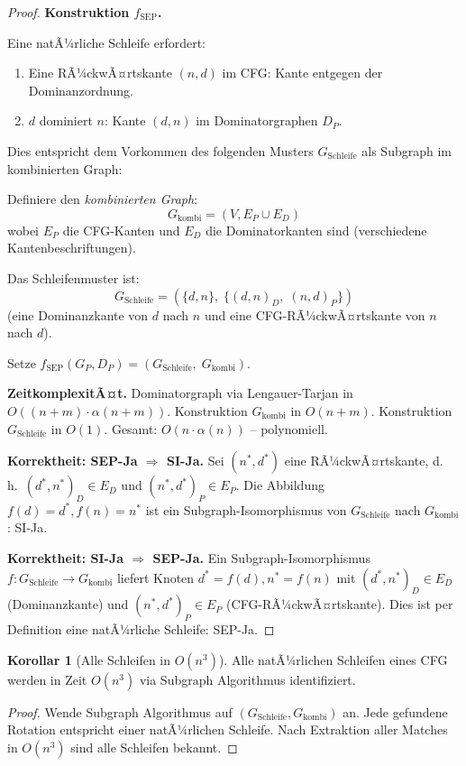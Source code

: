 ﻿\documentclass[a4paper,12pt]{article}
\theoremstyle{definition}
\newtheorem{korollar}{Korollar}
\begin{document}
\begin{proof}
\textbf{Konstruktion $f_{\text{SEP}}$.}

Eine natÃ¼rliche Schleife erfordert:
\begin{enumerate}
    \item Eine RÃ¼ckwÃ¤rtskante $(n, d)$ im CFG: Kante entgegen der Dominanzordnung.
    \item $d$ dominiert $n$: Kante $(d, n)$ im Dominatorgraphen $D_P$.
\end{enumerate}

Dies entspricht dem Vorkommen des folgenden Musters $G_{\text{Schleife}}$ als Subgraph im kombinierten Graph:

Definiere den \emph{kombinierten Graph}:
\[
G_{\text{kombi}} = (V, E_P \cup E_D)
\]
wobei $E_P$ die CFG-Kanten und $E_D$ die Dominatorkanten sind (verschiedene Kantenbeschriftungen).

Das Schleifenmuster ist:
\[
G_{\text{Schleife}} = (\{d, n\},\; \{(d, n)_D,\; (n, d)_P\})
\]
(eine Dominanzkante von $d$ nach $n$ und eine CFG-RÃ¼ckwÃ¤rtskante von $n$ nach $d$).

Setze $f_{\text{SEP}}(G_P, D_P) = (G_{\text{Schleife}},\; G_{\text{kombi}})$.

\textbf{ZeitkomplexitÃ¤t.}
Dominatorgraph via Lengauer-Tarjan in $O((n+m) \cdot \alpha(n+m))$. Konstruktion $G_{\text{kombi}}$ in $O(n + m)$. Konstruktion $G_{\text{Schleife}}$ in $O(1)$. Gesamt: $O(n \cdot \alpha(n))$ -- polynomiell.

\textbf{Korrektheit: SEP-Ja $\Rightarrow$ SI-Ja.}
Sei $(n^*, d^*)$ eine RÃ¼ckwÃ¤rtskante, d.\,h.\ $(d^*, n^*)_D \in E_D$ und $(n^*, d^*)_P \in E_P$. Die Abbildung $f(d) = d^*, f(n) = n^*$ ist ein Subgraph-Isomorphismus von $G_{\text{Schleife}}$ nach $G_{\text{kombi}}$: SI-Ja.

\textbf{Korrektheit: SI-Ja $\Rightarrow$ SEP-Ja.}
Ein Subgraph-Isomorphismus $f: G_{\text{Schleife}} \to G_{\text{kombi}}$ liefert Knoten $d^* = f(d), n^* = f(n)$ mit $(d^*, n^*)_D \in E_D$ (Dominanzkante) und $(n^*, d^*)_P \in E_P$ (CFG-RÃ¼ckwÃ¤rtskante). Dies ist per Definition eine natÃ¼rliche Schleife: SEP-Ja.
\end{proof}

\begin{korollar}[Alle Schleifen in $O(n^3)$]
Alle natÃ¼rlichen Schleifen eines CFG werden in Zeit $O(n^3)$ via Subgraph Algorithmus identifiziert.
\end{korollar}

\begin{proof}
Wende Subgraph Algorithmus auf $(G_{\text{Schleife}}, G_{\text{kombi}})$ an. Jede gefundene Rotation entspricht einer natÃ¼rlichen Schleife. Nach Extraktion aller Matches in $O(n^3)$ sind alle Schleifen bekannt.
\end{proof}
\end{document}
